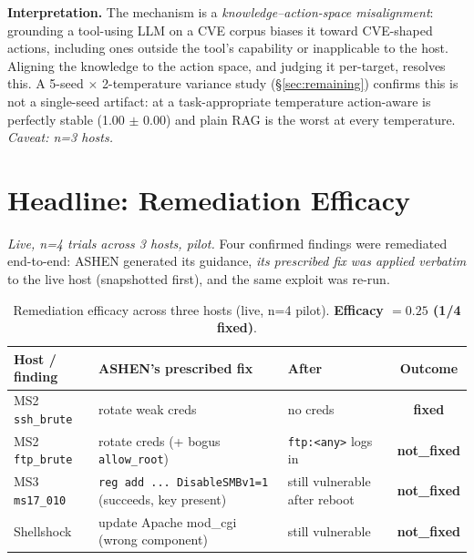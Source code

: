 \documentclass[conference]{IEEEtran}
\newcommand{\code}[1]{\texttt{#1}}
\begin{document}
\noindent\textbf{Interpretation.} The mechanism is a \emph{knowledge--action-space
misalignment}: grounding a tool-using LLM on a CVE corpus biases it toward
CVE-shaped actions, including ones outside the tool's capability or inapplicable
to the host. Aligning the knowledge to the action space, and judging it
per-target, resolves this. A 5-seed $\times$ 2-temperature variance study
(\S\ref{sec:remaining}) confirms this is not a single-seed artifact: at a
task-appropriate temperature action-aware is perfectly stable (1.00 $\pm$ 0.00)
and plain RAG is the worst at every temperature. \emph{Caveat: n=3 hosts.}

\section{Headline: Remediation Efficacy}\label{sec:remediation}
\emph{Live, n=4 trials across 3 hosts, pilot.} Four confirmed findings were
remediated end-to-end: ASHEN generated its guidance, \emph{its prescribed fix was
applied verbatim} to the live host (snapshotted first), and the same exploit was
re-run.

\begin{table}[t]
\caption{Remediation efficacy across three hosts (live, n=4 pilot).
\textbf{Efficacy $=0.25$ (1/4 fixed)}.}
\label{tab:remediation}
\centering
\begin{tabular}{p{1.9cm}p{2.5cm}p{1.4cm}c}
\toprule
Host / finding & ASHEN's prescribed fix & After & Outcome \\
\midrule
MS2 \code{ssh\_brute} & rotate weak creds & no creds & \textbf{fixed} \\
MS2 \code{ftp\_brute} & rotate creds (+ bogus \code{allow\_root}) & \code{ftp:<any>} logs in & \textbf{not\_fixed} \\
MS3 \code{ms17\_010} & \code{reg add ... DisableSMBv1=1} (succeeds, key present) & still vulnerable after reboot & \textbf{not\_fixed} \\
Shellshock & update Apache mod\_cgi (wrong component) & still vulnerable & \textbf{not\_fixed} \\
\bottomrule
\end{tabular}
\end{table}
\end{document}
